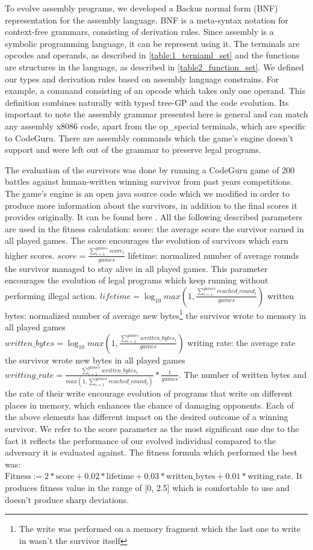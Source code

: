 \documentclass[dvipsnames,format=sigconf,anonymous=true,review=true]{acmart}
\begin{document}
To evolve assembly programs, we developed a Backus normal form (BNF) representation for the assembly language. BNF is a meta-syntax notation for context-free grammars, consisting of derivation rules. Since assembly is a symbolic programming language, it can be represent using it. The terminals are opcodes and operands, as described in \autoref{table:1_terniaml_set} and the functions are structures in the language, as described in \autoref{table2_function_set}. We defined our types and derivation rules based on assembly language constrains. For example, a command consisting of an opcode which takes only one operand. This definition combines naturally with typed tree-GP and the code evolution. Its important to note the assembly grammar presented here is general and can match any assembly x8086 code, apart from the op\_special terminals, which are specific to CodeGuru. There are assembly commands which the game's engine doesn't support and were left out of the grammar to preserve legal programs.

The evaluation of the survivors was done by running a CodeGuru game of 200 battles against human-written winning survivor from past years competitions. The game's engine is an open java source code which we modified in order to produce more information about the survivors, in addition to the final scores it provides originally. It can be found here \cite{ModifiedEngine}. All the following described parameters are used in the fitness calculation:
score: the average score the survivor earned in all played games. The score encourages the evolution of survivors which earn higher scores.
$score = \frac{\sum_{i=1}^{games} score_i}{games}$ 
lifetime: normalized number of average rounds the survivor managed to stay alive in all played games. This parameter encourages the evolution of legal programs which keep running without performing illegal action.
$lifetime = \log_{10} max(1, \frac{\sum_{i=1}^{games} reached\_round_i}{games})$
written bytes: normalized number of average new bytes\footnote{The write was performed on a memory fragment which the last one to write in wasn't the survivor itself} the survivor wrote to memory in all played games\\
$written\_bytes = \log_{10} max(1, \frac{\sum_{i=1}^{games} written\_bytes_i}{games})$
writing rate: the average rate the survivor wrote new bytes in all played games
$writting\_rate = \frac{\sum_{i=1}^{games} written\_bytes_i}{max(1, \sum_{i=1}^{games} reached\_round_i)} * \frac{1}{games}$. The number of written bytes and the rate of their write encourage evolution of programs that write on different places in memory, which enhances the chance of damaging opponents.
Each of the above elements has different impact on the desired outcome of a winning survivor. We refer to the score parameter as the most significant one due to the fact it reflects the performance of our evolved individual compared to the adversary it is evaluated against. The fitness formula which performed the best was: $\mbox{Fitness} := 2 * \mbox{score} + 0.02 * \mbox{lifetime} + 0.03 * \mbox{written\_bytes} + 0.01 * \mbox{writing\_rate}$. It produces fitness value in the range of [0, 2.5] which is comfortable to use and doesn't produce sharp deviations.
\end{document}
